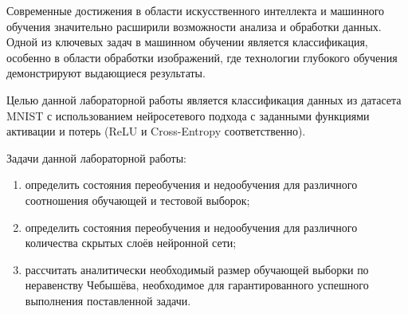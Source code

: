 
Современные достижения в области искусственного интеллекта и машинного обучения значительно расширили возможности анализа и обработки данных. Одной из ключевых задач в машинном обучении является классификация, особенно в области обработки изображений, где технологии глубокого обучения демонстрируют выдающиеся результаты.

Целью данной лабораторной работы является классификация данных из датасета MNIST с использованием нейросетевого подхода с заданными функциями активации и потерь (ReLU и Cross-Entropy соответственно).

Задачи данной лабораторной работы:
\begin{enumerate}[label*=\arabic*)]
	\item определить состояния переобучения и недообучения для различного соотношения обучающей и тестовой выборок;
	\item определить состояния переобучения и недообучения для различного количества скрытых слоёв нейронной сети;
	\item рассчитать аналитически необходимый размер обучающей выборки по неравенству Чебышёва, необходимое для гарантированного успешного выполнения поставленной задачи.
\end{enumerate}

\clearpage
